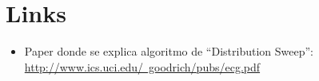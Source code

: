 \documentclass[dcc,uchile]{fcfmcourse}
\begin{document}
\section{Links}
\begin{itemize}
    \item Paper donde se explica algoritmo de ``Distribution Sweep'':\\ \href{http://www.ics.uci.edu/~goodrich/pubs/ecg.pdf}{http://www.ics.uci.edu/~goodrich/pubs/ecg.pdf}
\end{itemize}
\end{document}

